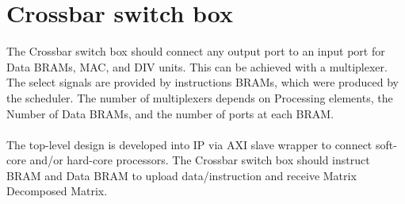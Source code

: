 \section{Crossbar switch box}

The Crossbar switch box should connect any output port to an input port for  Data BRAMs, MAC, and DIV units. This can be achieved with a multiplexer. The select signals are provided by instructions BRAMs, which were produced by the scheduler. The number of multiplexers depends on Processing elements, the Number of Data BRAMs, and the number of ports at each BRAM.
\\
\\
The top-level design is developed into IP via AXI slave wrapper to connect soft-core and/or hard-core processors. The Crossbar switch box should instruct BRAM and Data BRAM to upload data/instruction and receive Matrix Decomposed Matrix.
\pagebreak